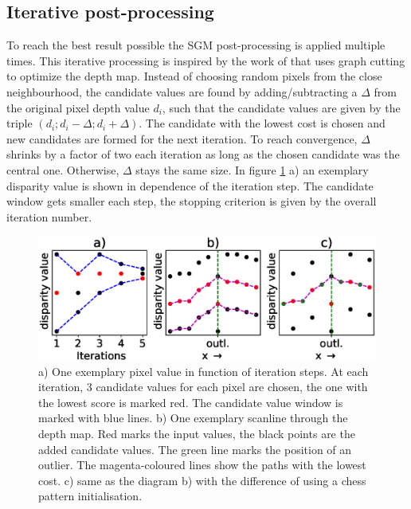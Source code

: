 \documentclass  [
  paper    = a4,
  BCOR     = 10mm,
  twoside,
  fontsize = 12pt,
  fleqn,
  toc      = bibnumbered,
  toc      = listofnumbered,
  numbers  = noendperiod,
  headings = normal,
  listof   = leveldown,
  version  = 3.03
]                                       {scrreprt}
\begin{document}
\subsection{Iterative post-processing}
\label{sec:iterative}
To reach the best result possible the SGM post-processing is applied multiple times. This iterative processing is inspired by the work of \cite{freist2018reconst} that uses graph cutting to optimize the depth map. Instead of choosing random pixels from the close neighbourhood, the candidate values are found by adding/subtracting a $\Delta$ from the original pixel depth value $d_{i}$, such that the candidate values are given by the triple $(d_{i};d_{i}-\Delta;d_{i}+\Delta)$. The candidate with the lowest cost is chosen and new candidates are formed for the next iteration. To reach convergence, $\Delta$ shrinks by a factor of two each iteration as long as the chosen candidate was the central one. Otherwise, $\Delta$ stays the same size. In figure \ref{fig:iterationsteps} a) an exemplary disparity value is shown in dependence of the iteration step. The candidate window gets smaller each step, the stopping criterion is given by the overall iteration number. 
\begin{figure}[h!]
	\centering
	\includegraphics[width=1\linewidth]{images/iteration_steps}
	\caption[Iterative SGM: Convergence]{a) One exemplary pixel value in function of iteration steps. At each iteration, 3 candidate values for each pixel are chosen, the one with the lowest score is marked red. The candidate value window is marked with blue lines. b) One exemplary scanline through the depth map. Red marks the input values, the black points are the added candidate values. The green line marks the position of an outlier. The magenta-coloured lines show the paths with the lowest cost. c) same as the diagram b) with the difference of using a chess pattern initialisation. }
	\label{fig:iterationsteps}
\end{figure}
\end{document}
